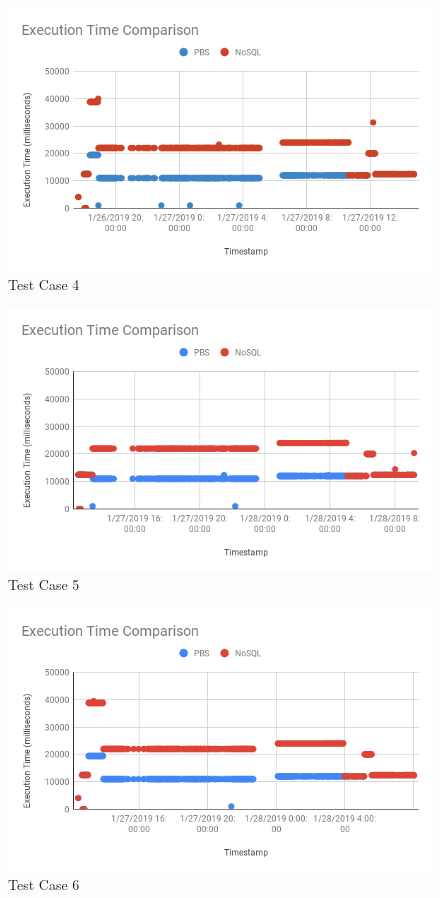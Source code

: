 \begin{figure}
\centering
\includegraphics[scale=0.70]{images/ETC_TC4.png}
\caption{Test Case 4}
\label{fig:etc_tc4}
\end{figure}

\begin{figure}
\centering
\includegraphics[scale=0.70]{images/ETC_TC5.png}
\caption{Test Case 5}
\label{fig:etc_tc5}
\end{figure}

\begin{figure}
\centering
\includegraphics[scale=0.70]{images/ETC_TC6.png}
\caption{Test Case 6}
\label{fig:etc_tc6}
\end{figure}

